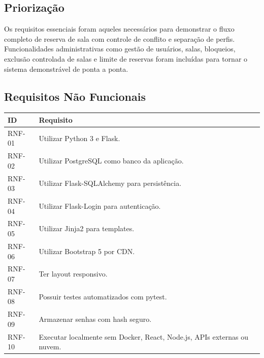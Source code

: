 \documentclass[12pt,a4paper]{article}
\begin{document}
\subsection{Priorização}
Os requisitos essenciais foram aqueles necessários para demonstrar o fluxo completo de reserva de sala com controle de conflito e separação de perfis. Funcionalidades administrativas como gestão de usuários, salas, bloqueios, exclusão controlada de salas e limite de reservas foram incluídas para tornar o sistema demonstrável de ponta a ponta.

\subsection{Requisitos Não Funcionais}
\begin{longtable}{|p{2cm}|p{12cm}|}
\hline
\textbf{ID} & \textbf{Requisito} \\ \hline
RNF-01 & Utilizar Python 3 e Flask. \\ \hline
RNF-02 & Utilizar PostgreSQL como banco da aplicação. \\ \hline
RNF-03 & Utilizar Flask-SQLAlchemy para persistência. \\ \hline
RNF-04 & Utilizar Flask-Login para autenticação. \\ \hline
RNF-05 & Utilizar Jinja2 para templates. \\ \hline
RNF-06 & Utilizar Bootstrap 5 por CDN. \\ \hline
RNF-07 & Ter layout responsivo. \\ \hline
RNF-08 & Possuir testes automatizados com pytest. \\ \hline
RNF-09 & Armazenar senhas com hash seguro. \\ \hline
RNF-10 & Executar localmente sem Docker, React, Node.js, APIs externas ou nuvem. \\ \hline
\end{longtable}
\end{document}
